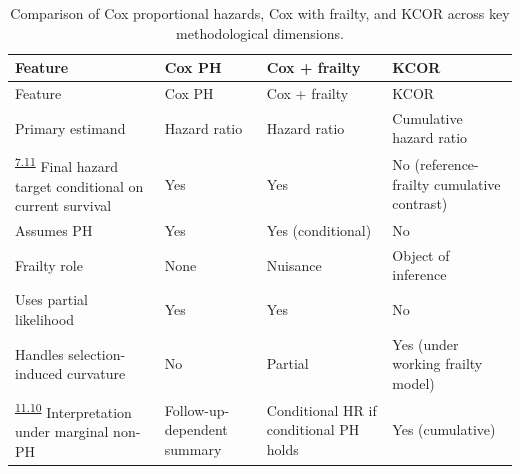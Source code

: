 \documentclass[
]{article}
\DeclareRobustCommand{\oldword}[1]{\leavevmode{\setbox0=\hbox{#1}\rlap{\raisebox{.5ex}{\rule{\wd0}{.45pt}}}\box0\relax}}
\begin{document}
\begin{longtable}[]{@{}
  >{\raggedright\arraybackslash}p{}
  >{\raggedright\arraybackslash}p{}
  >{\raggedright\arraybackslash}p{}
  >{\raggedright\arraybackslash}p{}@{}}
\caption{Comparison of Cox proportional hazards, Cox with frailty, and KCOR across key methodological dimensions.}\label{tbl:cox_vs_kcor}\tabularnewline
\toprule\noalign{}
\begin{minipage}[b]{\linewidth}\raggedright
Feature
\end{minipage} & \begin{minipage}[b]{\linewidth}\raggedright
Cox PH
\end{minipage} & \begin{minipage}[b]{\linewidth}\raggedright
Cox + frailty
\end{minipage} & \begin{minipage}[b]{\linewidth}\raggedright
KCOR
\end{minipage} \\
\midrule\noalign{}
\endfirsthead
\toprule\noalign{}
\begin{minipage}[b]{\linewidth}\raggedright
Feature
\end{minipage} & \begin{minipage}[b]{\linewidth}\raggedright
Cox PH
\end{minipage} & \begin{minipage}[b]{\linewidth}\raggedright
Cox + frailty
\end{minipage} & \begin{minipage}[b]{\linewidth}\raggedright
KCOR
\end{minipage} \\
\midrule\noalign{}
\endhead
\bottomrule\noalign{}
\endlastfoot
Primary estimand & Hazard ratio & Hazard ratio & Cumulative hazard ratio \\
\textsuperscript{\hyperlink{issue-7.11}{7.11}} \oldword{Conditions} \oldword{on} \oldword{survival} {\color{red} Final hazard target conditional on current survival} & Yes & Yes & \oldword{No} {\color{red} No (reference-frailty cumulative contrast)} \\
Assumes PH & Yes & Yes (conditional) & No \\
Frailty role & None & Nuisance & Object of inference \\
Uses partial likelihood & Yes & Yes & No \\
Handles selection-induced curvature & No & Partial & Yes (under working frailty model) \\
\textsuperscript{\hyperlink{issue-11.10}{11.10}} {\color{red} Interpretation under marginal non-PH} & {\color{red} Follow-up-dependent summary} & {\color{red} Conditional HR if conditional PH holds} & Yes (cumulative) \\
\end{longtable}
\end{document}
